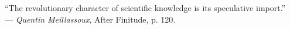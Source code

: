 
\begin{dedication}``The revolutionary character of scientific knowledge is its speculative import.'' \\
	--- \emph{Quentin Meillassoux}, After Finitude, p. 120.
\end{dedication}

